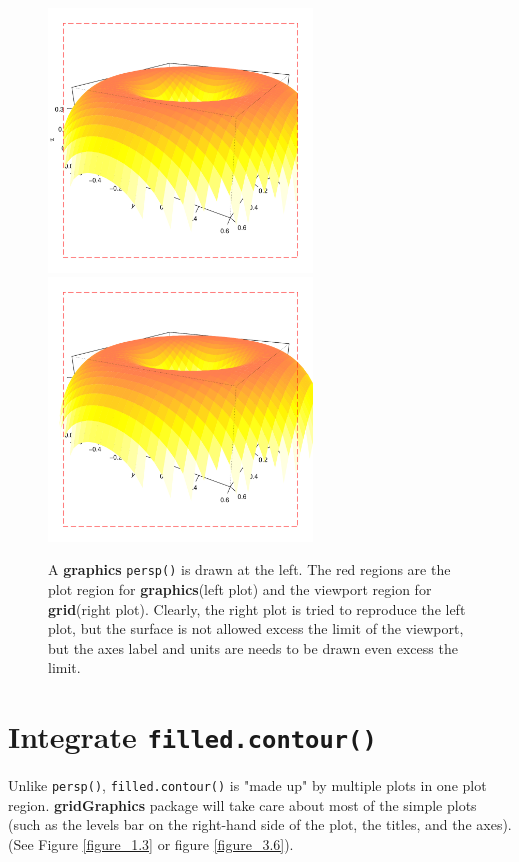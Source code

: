 \documentclass{report}
\begin{document}
\begin{figure}[h]
	\begin{center}
		\includegraphics[height = 7cm, width = 7cm]{figure/gridGraphics_persp_demo_viewport3_1.pdf}
		\includegraphics[height = 7cm, width = 7cm]{figure/gridGraphics_persp_demo_viewport3_2.pdf}
		\caption{A \textbf{graphics} \texttt{persp()} is drawn at the left. The red regions are the plot region for \textbf{graphics}(left plot) and the viewport region for \textbf{grid}(right plot). Clearly, the right plot is tried to reproduce the left plot, but the surface is not allowed excess the limit of the viewport, but the axes label and units are needs to be drawn even excess the limit.}
		\label{figure_4.5}
	\end{center}
\end{figure}



\section{Integrate \texttt{filled.contour()}}
Unlike \texttt{persp()}, \texttt{filled.contour()} is "made up" by multiple plots in one plot region. \textbf{gridGraphics} package will take care about most of the simple plots (such as the levels bar on the right-hand side of the plot, the titles, and the axes). (See Figure \ref{figure_1.3} or figure \ref{figure_3.6}).\\
\end{document}
